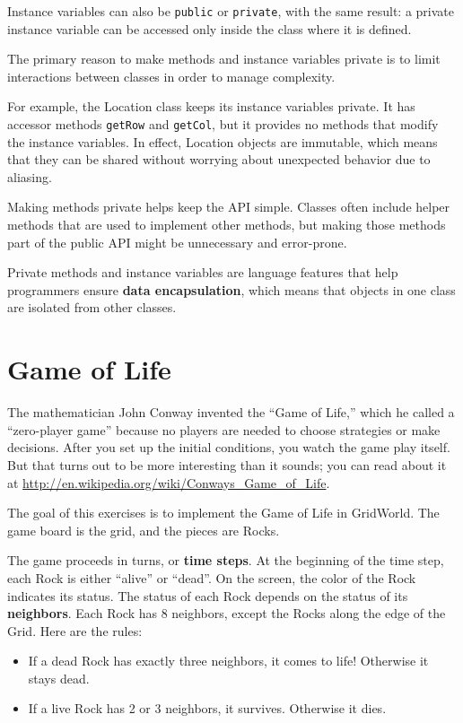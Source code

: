 Instance variables can also be {\tt public} or {\tt private}, with
the same result: a private instance variable can be accessed only
inside the class where it is defined.

The primary reason to make methods and instance variables private
is to limit interactions between classes in order to manage
complexity.

For example, the Location class keeps its instance variables private.
It has accessor methods {\tt getRow} and {\tt getCol}, but it provides
no methods that modify the instance variables.  In effect, Location
objects are immutable, which means that they can be shared without
worrying about unexpected behavior due to aliasing.

Making methods private helps keep the API simple.  Classes often
include helper methods that are used to implement other methods, but
making those methods part of the public API might be unnecessary
and error-prone.

Private methods and instance variables are language features
that help programmers ensure {\bf data encapsulation}, which means
that objects in one class are isolated from other classes.


\section{Game of Life}

The mathematician John Conway invented
the ``Game of Life,'' which he called a ``zero-player game''
because no players are needed to choose strategies or make decisions.
After you set up the initial conditions, you watch the game
play itself.  But that turns out to be more interesting than it sounds;
you can read about it at
\url{http://en.wikipedia.org/wiki/Conways_Game_of_Life}.

The goal of this exercises is to implement the Game of Life in
GridWorld.  The game board is the grid, and the pieces are Rocks.

The game proceeds in turns, or {\bf time steps}.  At the beginning
of the time step, each Rock is either ``alive'' or ``dead''.  On the
screen, the color of the Rock indicates its status.
%
The status of each Rock depends on the status of its
{\bf neighbors}.  Each Rock has 8 neighbors, except the Rocks along
the edge of the Grid.  Here are the rules:

\begin{itemize}

\item If a dead Rock has exactly three neighbors, it comes to life!
Otherwise it stays dead.

\item If a live Rock has 2 or 3 neighbors, it survives.  Otherwise it dies.

\end{itemize}

